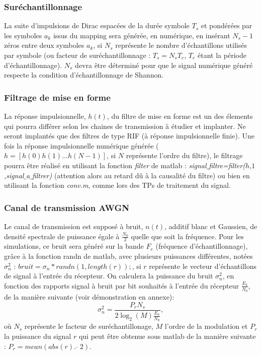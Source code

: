 \documentclass{article}
\begin{document}
\subsubsection{Suréchantillonnage}
La suite d'impulsions de Dirac espacées de la durée symbole $T_s$ et pondérées par les symboles $a_k$ issus du mapping sera générée, en numérique, en insérant $N_s-1$ zéros entre deux symboles $a_k$, si $N_s$ représente le nombre d'échantillons utilisés par symbole (ou facteur de suréchantillonnage : $T_s=N_sT_e$, $T_e$ étant la période d'échantillonnage). $N_s$ devra être déterminé pour que le signal numérique généré respecte la condition d'échantillonnage de Shannon.

\subsubsection{Filtrage de mise en forme}
La réponse impulsionnelle, $h(t)$, du filtre de mise en forme est un des élements qui pourra différer selon les chaines de transmission à étudier et implanter. Ne seront implantés que des filtres de type RIF (à réponse impulsionnelle finie). Une fois la réponse impulsionnelle numérique générée ($h=\left[h(0) h(1) ... h(N-1)\right]$, si $N$ représente l'ordre du filtre), le filtrage pourra être réalisé en utilisant la fonction \emph{filter} de matlab : \emph{signal$\_$filtre=filter($h$,$1$,signal$\_$a$\_$filtrer)} (attention alors au retard dû à la causalité du filtre) ou bien en utilisant la fonction \emph{conv.m}, comme lors des TPs de traitement du signal.

\subsubsection{Canal de transmission AWGN}
Le canal de transmission est supposé à bruit, $n(t)$, additif blanc et Gaussien, de densité spectrale de puissance égale à $\frac{N_0}{2}$ quelle que soit la fréquence. Pour les simulations, ce bruit sera généré sur la bande $F_e$ (fréquence d'échantillonnage), grâce à la fonction randn de matlab, avec plusieurs puissances différentes, notées $\sigma_n^2$ : $bruit=\sigma_n \ast randn(1,length(r));$, si $r$ représente le vecteur d'échantillons de signal à l'entrée du récepteur. On calculera la puissance du bruit $\sigma_n^2$, en fonction des rapports signal à bruit par bit souhaités à l'entrée du récepteur $\frac{E_b}{N_0}$, de la manière suivante (voir démonstration en annexe):
$$
\sigma_n^2=\frac{P_r N_s}{2 \log_2(M) \frac{E_b}{N_0}},
$$
où $N_s$ représente le facteur de suréchantillonage, $M$ l'ordre de la modulation et $P_r$ la puissance du signal $r$ qui peut être obtenue sous matlab de la manière suivante : $P_r=mean(abs(r). \; \hat{ }\;2)$.
\end{document}

